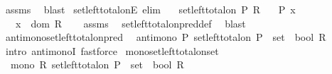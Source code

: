 \begin{isabellebody}
\ assms\ \isamarkupfalse%
\ blast%
\endisatagproof
{\isafoldproof}%
%
\isadelimproof
\isanewline
%
\endisadelimproof
\isanewline
{}\isamarkupfalse%
\ set{\isacharunderscore}{\kern0pt}left{\isacharunderscore}{\kern0pt}total{\isacharunderscore}{\kern0pt}onE\ {\isacharbrackleft}{\kern0pt}elim{\isacharbrackright}{\kern0pt}{\isacharcolon}{\kern0pt}\isanewline
\ \ \ {\isachardoublequoteopen}set{\isacharunderscore}{\kern0pt}left{\isacharunderscore}{\kern0pt}total{\isacharunderscore}{\kern0pt}on\ P\ R{\isachardoublequoteclose}\isanewline
\ \ \ {\isachardoublequoteopen}P\ x{\isachardoublequoteclose}\isanewline
\ \ \ {\isachardoublequoteopen}x\ {\isasymin}\ dom\ R{\isachardoublequoteclose}\isanewline
%
\isadelimproof
\ \ %
\endisadelimproof
%
\isatagproof
{}\isamarkupfalse%
\ assms\ \isamarkupfalse%
\ set{\isacharunderscore}{\kern0pt}left{\isacharunderscore}{\kern0pt}total{\isacharunderscore}{\kern0pt}on{\isacharunderscore}{\kern0pt}pred{\isacharunderscore}{\kern0pt}def\ \isamarkupfalse%
\ blast%
\endisatagproof
{\isafoldproof}%
%
\isadelimproof
\isanewline
%
\endisadelimproof
\isanewline
{}\isamarkupfalse%
\ antimono{\isacharunderscore}{\kern0pt}set{\isacharunderscore}{\kern0pt}left{\isacharunderscore}{\kern0pt}total{\isacharunderscore}{\kern0pt}on{\isacharunderscore}{\kern0pt}pred{\isacharcolon}{\kern0pt}\isanewline
\ \ {\isachardoublequoteopen}antimono\ {\isacharparenleft}{\kern0pt}{\isasymlambda}P{\isachardot}{\kern0pt}\ set{\isacharunderscore}{\kern0pt}left{\isacharunderscore}{\kern0pt}total{\isacharunderscore}{\kern0pt}on\ {\isacharparenleft}{\kern0pt}P\ {\isacharcolon}{\kern0pt}{\isacharcolon}{\kern0pt}\ set\ {\isasymRightarrow}\ bool{\isacharparenright}{\kern0pt}\ R{\isacharparenright}{\kern0pt}{\isachardoublequoteclose}\isanewline
%
\isadelimproof
\ \ %
\endisadelimproof
%
\isatagproof
{}\isamarkupfalse%
\ {\isacharparenleft}{\kern0pt}intro\ antimonoI{\isacharparenright}{\kern0pt}\ fastforce%
\endisatagproof
{\isafoldproof}%
%
\isadelimproof
\isanewline
%
\endisadelimproof
\isanewline
{}\isamarkupfalse%
\ mono{\isacharunderscore}{\kern0pt}set{\isacharunderscore}{\kern0pt}left{\isacharunderscore}{\kern0pt}total{\isacharunderscore}{\kern0pt}on{\isacharunderscore}{\kern0pt}set{\isacharcolon}{\kern0pt}\isanewline
\ \ {\isachardoublequoteopen}mono\ {\isacharparenleft}{\kern0pt}{\isasymlambda}R{\isachardot}{\kern0pt}\ set{\isacharunderscore}{\kern0pt}left{\isacharunderscore}{\kern0pt}total{\isacharunderscore}{\kern0pt}on\ {\isacharparenleft}{\kern0pt}P\ {\isacharcolon}{\kern0pt}{\isacharcolon}{\kern0pt}\ set\ {\isasymRightarrow}\ bool{\isacharparenright}{\kern0pt}\ R{\isacharparenright}{\kern0pt}{\isachardoublequoteclose}\isanewline

\end{isabellebody}
